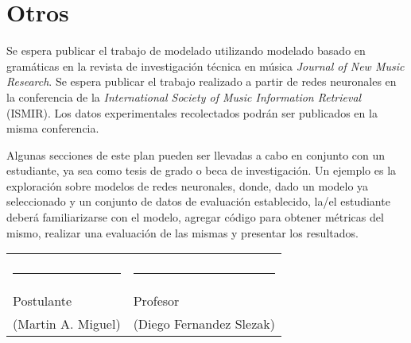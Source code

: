\documentclass[a4paper,11pt]{article}
\begin{document}
\section*{Otros}

Se espera publicar el trabajo de modelado utilizando modelado basado en
gramáticas en la revista de investigación técnica en música \emph{Journal of
New Music Research}. Se espera publicar el trabajo realizado a partir de
redes neuronales en la conferencia de la \emph{International Society of Music
  Information Retrieval} (ISMIR). Los datos experimentales recolectados podrán
  ser publicados en la misma conferencia.

Algunas secciones de este plan pueden ser llevadas a cabo en conjunto con un
estudiante, ya sea como tesis de grado o beca de investigación. Un ejemplo es
la exploración sobre modelos de redes neuronales, donde, dado un modelo ya
seleccionado y un conjunto de datos de evaluación establecido, la/el estudiante
deberá familiarizarse con el modelo, agregar código para obtener métricas del
mismo, realizar una evaluación de las mismas y presentar los resultados.

\noindent\begin{tabular}{p{} p{}}
    \vspace{1.5cm} & \\
       \rule[0pt]{2in}{0.5pt} & 
        \rule[0pt]{2in}{0.5pt}\\
        Postulante & Profesor \\
        (Martin A. Miguel) &  (Diego Fernandez Slezak)
        \end{tabular}


{\small


}
\end{document}
